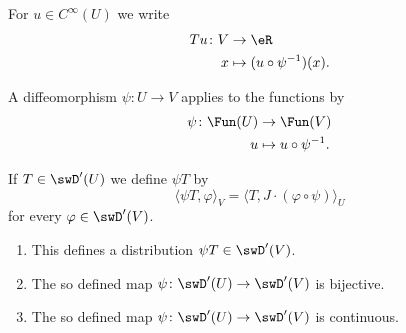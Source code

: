 For \( u\in  C^{\infty}(U)\) we write
\begin{equation}        \label{EQooHSVBooIZRxzh}
    \begin{aligned}
        Tu\colon V&\to \eR \\
        x&\mapsto (u\circ \psi^{-1})(x). 
    \end{aligned}
\end{equation}

A diffeomorphism \( \psi\colon U\to V\) applies to the functions by
\begin{equation}        \label{EQooMZSEooATfSTR}
    \begin{aligned}
        \psi\colon \Fun(U)&\to \Fun(V) \\
        u&\mapsto u\circ\psi^{-1}. 
    \end{aligned}
\end{equation}

\begin{propositionDef}      \label{PROPooXAOKooQSBKHg}
If \( T\in \swD'(U)\) we define \( \psi T\) by
\begin{equation}
    \langle \psi T, \varphi\rangle_V=\langle T, J\cdot(\varphi\circ \psi)\rangle_U
\end{equation}
for every \( \varphi\in\swD'(V)\). 

\begin{enumerate}
    \item       \label{ITEMooXHELooYhXNRs}
        This defines a distribution \( \psi T\in \swD'(V)\).
    \item       \label{ITEMooGDCYooVDFpuy}
        The so defined map \( \psi\colon \swD'(U)\to \swD'(V)\) is bijective.
    \item       \label{ITEMooNGSJooEdRgHt}
        The so defined map \( \psi\colon \swD'(U)\to \swD'(V)\) is continuous.
\end{enumerate}

\end{propositionDef}

